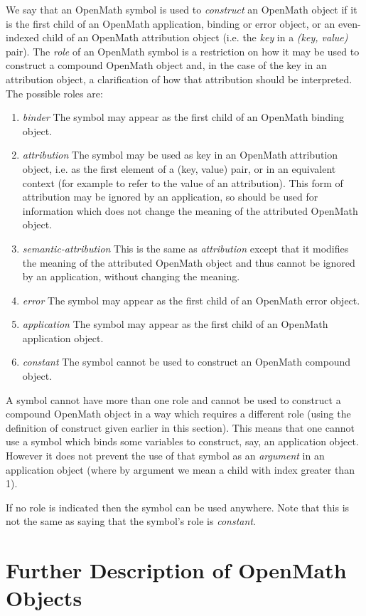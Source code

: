 \documentclass{report}
\def\OM{OpenMath\xspace}
\begin{document}
We say that an \OM symbol is used to \emph{construct}
an \OM object if it is the first child of an \OM application,
binding or error object, or an even-indexed child of an \OM
attribution object (i.e. the \emph{key} in a
\emph{(key, value)} pair).
The \emph{role} of an \OM symbol is a restriction
on how it may be used to construct a compound \OM object and, in the
case of the key in an attribution object, a clarification of how that
attribution should be interpreted.  The possible roles are:
\begin{enumerate}[(\em i\rm)]
\item \emph{binder} The symbol may appear as the first child of an \OM binding object.
\item \emph{attribution} The symbol may be used as key in an \OM attribution object,
  i.e. as the first element of a (key, value) pair, or in an equivalent context (for
  example to refer to the value of an attribution).  This form of attribution may be
  ignored by an application, so should be used for information which does not change the
  meaning of the attributed \OM object.
\item \emph{semantic-attribution} This is the same as \emph{attribution} except that it
  modifies the meaning of the attributed \OM object and thus cannot be ignored by an
  application, without changing the meaning.
\item \emph{error} The symbol may appear as the first child of an \OM error object.
\item \emph{application} The symbol may appear as the first child of an \OM application
  object.
\item \emph{constant} The symbol cannot be used to construct an \OM compound object.
\end{enumerate}
A symbol cannot have more than one role and cannot be used to construct a compound \OM
object in a way which requires a different role (using the definition of construct given
earlier in this section).  This means that one cannot use a symbol which binds some
variables to construct, say, an application object.  However it does not prevent the use
of that symbol as an \emph{argument} in an application object (where by argument we mean a
child with index greater than 1).
 
If no role is indicated then the symbol can be used anywhere.  Note that this is not the
same as saying that the symbol's role is \emph{constant}.

\section{Further Description of \OM Objects}\label{sec_omin}
\end{document}

